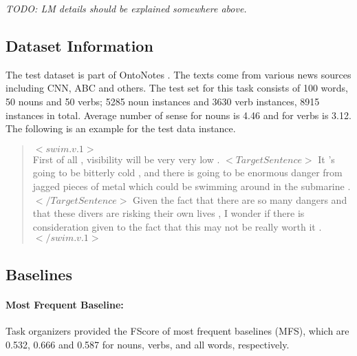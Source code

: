 
\emph{TODO: LM details should be explained somewhere above.}


\subsection{Dataset Information} 
The test dataset is part of OntoNotes \cite{hovy06ontonotes}. The texts come from various news sources including CNN, ABC and others. The test set for this task consists of 100 words, 50 nouns and 50 verbs; 5285 noun instances and 3630 verb instances, 8915 instances in total. Average number of sense for nouns is 4.46 and for verbs is 3.12. The following is an example for the test data instance.

\begin{quote}
  $<swim.v.1>$ \\
 First of all , visibility will be very very low . $<TargetSentence>$ It 
 's going to be bitterly cold , and there is going to be enormous 
 danger from jagged pieces of metal which could be swimming around in
 the submarine . $</TargetSentence>$ Given the fact that there are so many
 dangers and that these divers are risking their own lives , I wonder
 if there is consideration given to the fact that this may not be 
 really worth it . \\
 $</swim.v.1>$
\end{quote}




\subsection{Baselines}
\label{semeval10-baselines}

\paragraph{Most Frequent Baseline:} Task organizers provided the FScore of most frequent baselines (MFS), which are 0.532, 0.666 and 0.587 for nouns, verbs, and all words, respectively.
